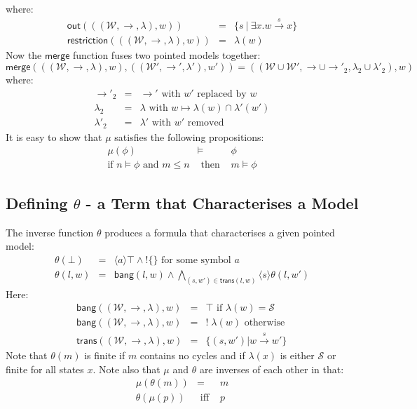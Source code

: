 \documentclass[smallextended]{svjour3}       %
\numberwithin{subcase}{mycase}
\def\fOr {\ | \ }
\begin{document}
where:
\begin{eqnarray}
\mathsf{out}(((\mathcal{W},\rightarrow,\lambda),w)) & = & \{ s \fOr \exists x . w \xrightarrow{s} x \} \nonumber \\
\mathsf{restriction}(((\mathcal{W},\rightarrow,\lambda),w)) & = & \lambda(w) \nonumber
\end{eqnarray}
Now the $\mathsf{merge}$ function fuses two pointed models together:
\[
\mathsf{merge}( ( (\mathcal{W}, \rightarrow, \lambda), w),  ( (\mathcal{W}', \rightarrow', \lambda'), w')) = ((\mathcal{W} \cup \mathcal{W}', \rightarrow \cup \rightarrow'_2, \lambda_2 \cup \lambda'_2), w)
\]
where:
\begin{eqnarray}
\rightarrow'_2 & = & \rightarrow' \mbox{ with } w' \mbox{ replaced by } w \nonumber \\
\lambda_2 & = & \lambda \mbox{ with } w \mapsto \lambda(w) \cap \lambda'(w') \nonumber \\
\lambda'_2 & = & \lambda' \mbox{ with } w' \mbox{ removed } \nonumber
\end{eqnarray}
It is easy to show that $\mu$ satisfies the following propositions:
\begin{eqnarray}
\mu(\phi) & \models & \phi \nonumber \\
\mbox{if }n \models \phi \mbox{ and } m \leq n & \mbox{ then } & m \models \phi \nonumber
\end{eqnarray}
\subsection{Defining $\theta$ - a Term that Characterises a Model}
The inverse function $\theta$ produces a formula that characterises a given pointed model:
\begin{eqnarray}
\theta(\bot) & = & \langle a \rangle \top \land ! \{ \} \mbox{ for some symbol }a \nonumber \\
\theta(l, w) & = & \mathsf{bang}(l,w) \land \bigwedge_{(s,w') \in \mathsf{trans}(l,w)} \langle s \rangle \theta(l, w') \nonumber 
\end{eqnarray}
Here:
\begin{eqnarray}
\mathsf{bang}((\mathcal{W},\rightarrow,\lambda),w) & = & \top \mbox{ if } \lambda(w) = \mathcal{S} \nonumber \\
\mathsf{bang}((\mathcal{W},\rightarrow,\lambda),w) & = & ! \; \lambda(w) \mbox{ otherwise } \nonumber \\
\mathsf{trans}((\mathcal{W},\rightarrow, \lambda),w) & = & \{(s,w') | w \xrightarrow{s} w' \} \nonumber
\end{eqnarray}
Note that $\theta(m)$ is finite if $m$ contains no cycles and if $\lambda(x)$ is either $\mathcal{S}$ or finite for all states $x$.
Note also that $\mu$ and $\theta$ are inverses of each other in that:
\begin{eqnarray}
\mu(\theta(m)) & = & m \nonumber \\
\theta(\mu(p)) & \mbox{ iff } & p \nonumber
\end{eqnarray}
\end{document}
